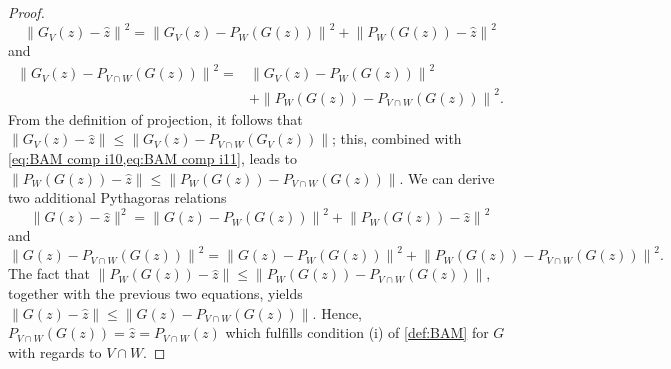 \documentclass[smallextended,numbook,nospthms]{svjour3}
\theoremstyle{plain}
\theoremstyle{definition}
\begin{document}
\begin{proof}
	\begin{equation}\label{eq:BAM comp i10}
		\left\|G_{V}(z)-\hat{z}\right\|^{2}=\left\|G_{V}(z)-P_{W}(G(z))\right\|^{2}+\left\|P_{W}(G(z))-\hat{z}\right\|^{2}
	\end{equation}
	and
	\begin{align}
		\left\|G_{V}(z)-P_{V \cap W}(G(z))\right\|^{2}=&\left\|G_{V}(z)-P_{W}(G(z))\right\|^{2} \\
		&+\left\|P_{W}(G(z))-P_{V \cap W}(G(z))\right\|^{2}. \label{eq:BAM comp i11}
	\end{align}
	From the definition of projection, it follows that $\left\|G_{V}(z)-\hat{z}\right\| \leq\left\|G_{V}(z)-P_{V \cap W}\left(G_{V}(z)\right)\right\|$; this, combined with \cref{eq:BAM comp i10,eq:BAM comp i11}, leads to $\left\|P_{W}(G(z))-\hat{z}\right\| \leq\left\|P_{W}(G(z))-P_{V \cap W}(G(z))\right\|$.
	We can derive two additional Pythagoras relations
	\begin{equation}\label{eq:BAM comp i12}
		\|G(z)-\hat{z}\|^{2}=\left\|G(z)-P_{W}(G(z))\right\|^{2}+\left\|P_{W}(G(z))-\hat{z}\right\|^{2}
	\end{equation}
	and
	\begin{equation}\label{eq:BAM comp i13}
		\left\|G(z)-P_{V \cap W}(G(z))\right\|^{2}=\left\|G(z)-P_{W}(G(z))\right\|^{2}+\left\|P_{W}(G(z))-P_{V \cap W}(G(z))\right\|^{2}.
	\end{equation}
	The fact that $\left\|P_{W}(G(z))-\hat{z}\right\| \leq\left\|P_{W}(G(z))-P_{V \cap W}(G(z))\right\|$, together with the previous two equations, yields $\|G(z)-\hat{z}\| \leq\left\|G(z)-P_{V \cap W}(G(z))\right\| .$ Hence, $P_{V \cap W}(G(z))=\hat{z}=P_{V \cap W}(z)$ which fulfills condition (i) of \cref{def:BAM} for $G$ with regards to $V \cap W$.
	

\end{proof}
\end{document}
